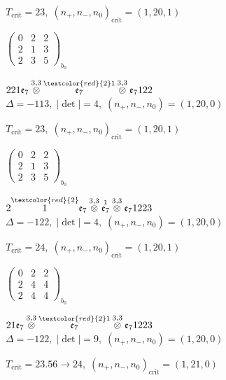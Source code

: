 \documentclass[10pt]{article}
\begin{document}
\hspace{1em}$T_{\text{crit}}=23,\; (n_+,n_-,n_0)_{\text{crit}}=(1,20,1)$

\hspace{2em}$\left(\begin{smallmatrix}0 & 2 & 2 \\ 2 & 1 & 3 \\ 2 & 3 & 5\end{smallmatrix}\right)_{\!b_0}$

\smallskip

$221\mathfrak{e}_7\overset{3,3}{\otimes}\overset{\textcolor{red}{2}1}{\mathfrak{e}_7}\overset{3,3}{\otimes}\mathfrak{e}_7122$ \quad $\Delta=-113,\; |\det|=4,\; (n_+,n_-,n_0)=(1,20,0)$

\hspace{1em}$T_{\text{crit}}=23,\; (n_+,n_-,n_0)_{\text{crit}}=(1,20,1)$

\hspace{2em}$\left(\begin{smallmatrix}0 & 2 & 2 \\ 2 & 1 & 3 \\ 2 & 3 & 5\end{smallmatrix}\right)_{\!b_0}$

\smallskip

$2\overset{\textcolor{red}{2}}{1}\mathfrak{e}_7\overset{3,3}{\otimes}\overset{1}{\mathfrak{e}_7}\overset{3,3}{\otimes}\mathfrak{e}_71223$ \quad $\Delta=-122,\; |\det|=4,\; (n_+,n_-,n_0)=(1,20,0)$

\hspace{1em}$T_{\text{crit}}=24,\; (n_+,n_-,n_0)_{\text{crit}}=(1,20,1)$

\hspace{2em}$\left(\begin{smallmatrix}0 & 2 & 2 \\ 2 & 4 & 4 \\ 2 & 4 & 4\end{smallmatrix}\right)_{\!b_0}$

$21\mathfrak{e}_7\overset{3,3}{\otimes}\overset{\textcolor{red}{2}1}{\mathfrak{e}_7}\overset{3,3}{\otimes}\mathfrak{e}_71223$ \quad $\Delta=-122,\; |\det|=9,\; (n_+,n_-,n_0)=(1,20,0)$

\hspace{1em}$T_{\text{crit}}=23.56 \to 24,\; (n_+,n_-,n_0)_{\text{crit}}=(1,21,0)$
\end{document}
